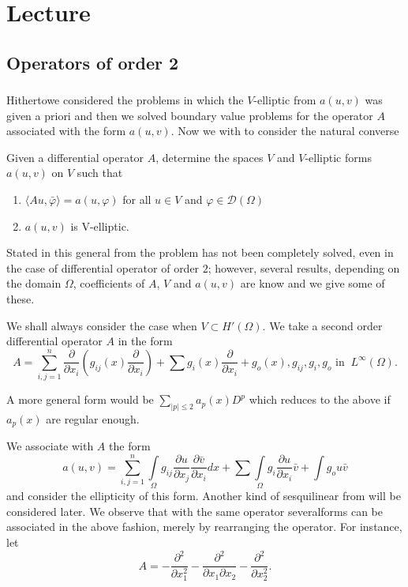 
\chapter{Lecture}\label{lec10}%

\setcounter{section}{5}
\section{Operators of order 2}\label{lec10:sec6}%

\subsection{}\label{lec10:sec6:subsec1}

Hitherto\pageoriginale we considered the problems in which the $V$-elliptic from $a
(u,v)$ was given a priori and then we solved boundary value problems
for the operator $A$ associated with the form $a (u,v)$. Now we with
to consider the natural converse  

\begin{prob*} 
Given a differential operator $A$, determine the spaces $V$ and
$V$-elliptic forms $a(u, v)$ on $V$ such that 
\begin{enumerate}[\rm 1)]
\item $\langle Au, \bar{\varphi} \rangle = a (u, \varphi)$ for all $u
  \in V$ and $\varphi \in \mathscr{D} (\Omega)$ 
\item $a(u,v)$ is V-elliptic.
\end{enumerate}
\end{prob*}

Stated in this general from the problem has not been completely
solved, even in the case of differential operator of order $2$;
however, several results, depending on the domain $\Omega$,
coefficients of $A$, $V$ and $a(u,v)$ are know and we give some of
these. 

We shall always consider the case when $V \subset H' (\Omega)$. We
take a second order differential operator $A$ in the form 
$$
A=  \sum_{i,j=1}^{n} \frac{\partial}{\partial x_i} \left(g_{ij}(x)
\frac{\partial}{\partial x_i}\right) + \sum g_i (x) \frac{\partial}{\partial
  x_i} + g_o (x), g_{ij}, g_i , g_o \text{ in }~ L^{\infty} (\Omega). 
$$

A more general form would be $\sum\limits_{|p| \leq 2} a_p (x)
D^p$ which reduces to the above if $a_p (x)$ are regular enough. 

We associate with $A$ the form
$$
a(u,v) = \sum_{i, j=1}^{n} \int\limits_{\Omega} g_{ij} \frac{\partial
  u}{\partial x_j} \frac{\partial \bar{v}}{\partial x_i} dx + \sum
\int\limits_{\Omega} g_i \frac{\partial u}{\partial x_i} \bar{v} +
\int g_o u \bar{v} 
$$
and consider the ellipticity of this form. Another kind of 
sesquilinear from will be considered later. We observe that with the 
same operator several\pageoriginale forms can be associated in the above fashion, 
merely by rearranging the operator. For instance, let   
$$
A =- \frac{\partial ^2}{\partial x^2 _1}- \frac{\partial^2}{\partial
  x_1 \partial x_2} - \frac{\partial ^2}{\partial x^2_2}. 
$$

